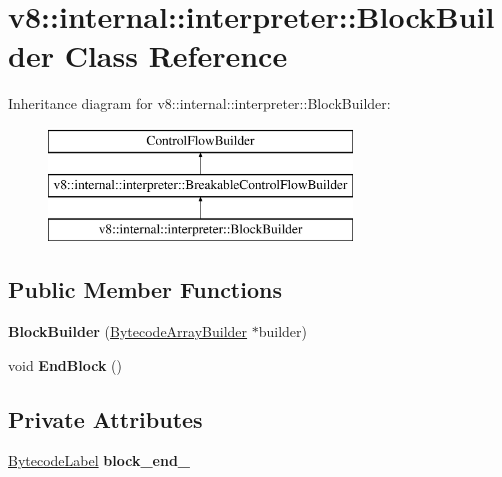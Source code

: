 \hypertarget{classv8_1_1internal_1_1interpreter_1_1_block_builder}{}\section{v8\+:\+:internal\+:\+:interpreter\+:\+:Block\+Builder Class Reference}
\label{classv8_1_1internal_1_1interpreter_1_1_block_builder}
Inheritance diagram for v8\+:\+:internal\+:\+:interpreter\+:\+:Block\+Builder\+:\begin{figure}[H]
\begin{center}
\leavevmode
\includegraphics[height=3.000000cm]{classv8_1_1internal_1_1interpreter_1_1_block_builder}
\end{center}
\end{figure}
\subsection*{Public Member Functions}
\begin{DoxyCompactItemize}
\item 
{\bfseries Block\+Builder} (\hyperlink{classv8_1_1internal_1_1interpreter_1_1_bytecode_array_builder}{Bytecode\+Array\+Builder} $\ast$builder)\hypertarget{classv8_1_1internal_1_1interpreter_1_1_block_builder_a9ae25fb82db08cc51065e65d0f63251c}{}\label{classv8_1_1internal_1_1interpreter_1_1_block_builder_a9ae25fb82db08cc51065e65d0f63251c}

\item 
void {\bfseries End\+Block} ()\hypertarget{classv8_1_1internal_1_1interpreter_1_1_block_builder_a8654a579e8f2e7d1ef1f845b92754071}{}\label{classv8_1_1internal_1_1interpreter_1_1_block_builder_a8654a579e8f2e7d1ef1f845b92754071}

\end{DoxyCompactItemize}
\subsection*{Private Attributes}
\begin{DoxyCompactItemize}
\item 
\hyperlink{classv8_1_1internal_1_1interpreter_1_1_bytecode_label}{Bytecode\+Label} {\bfseries block\+\_\+end\+\_\+}\hypertarget{classv8_1_1internal_1_1interpreter_1_1_block_builder_a2fed0927fef39a7d0a9a0180d9130222}{}\label{classv8_1_1internal_1_1interpreter_1_1_block_builder_a2fed0927fef39a7d0a9a0180d9130222}

\end{DoxyCompactItemize}
